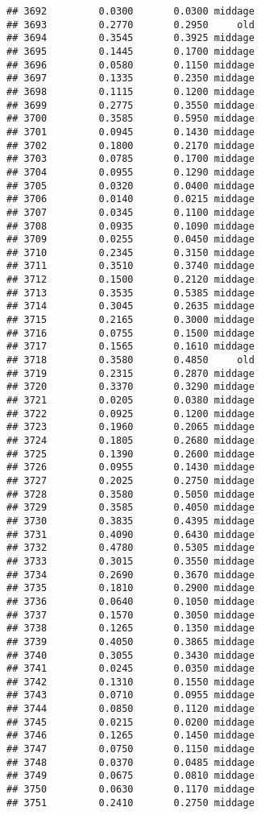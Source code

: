 \documentclass[
]{article}
\begin{document}
\begin{verbatim}
## 3692         0.0300       0.0300 middage
## 3693         0.2770       0.2950     old
## 3694         0.3545       0.3925 middage
## 3695         0.1445       0.1700 middage
## 3696         0.0580       0.1150 middage
## 3697         0.1335       0.2350 middage
## 3698         0.1115       0.1200 middage
## 3699         0.2775       0.3550 middage
## 3700         0.3585       0.5950 middage
## 3701         0.0945       0.1430 middage
## 3702         0.1800       0.2170 middage
## 3703         0.0785       0.1700 middage
## 3704         0.0955       0.1290 middage
## 3705         0.0320       0.0400 middage
## 3706         0.0140       0.0215 middage
## 3707         0.0345       0.1100 middage
## 3708         0.0935       0.1090 middage
## 3709         0.0255       0.0450 middage
## 3710         0.2345       0.3150 middage
## 3711         0.3510       0.3740 middage
## 3712         0.1500       0.2120 middage
## 3713         0.3535       0.5385 middage
## 3714         0.3045       0.2635 middage
## 3715         0.2165       0.3000 middage
## 3716         0.0755       0.1500 middage
## 3717         0.1565       0.1610 middage
## 3718         0.3580       0.4850     old
## 3719         0.2315       0.2870 middage
## 3720         0.3370       0.3290 middage
## 3721         0.0205       0.0380 middage
## 3722         0.0925       0.1200 middage
## 3723         0.1960       0.2065 middage
## 3724         0.1805       0.2680 middage
## 3725         0.1390       0.2600 middage
## 3726         0.0955       0.1430 middage
## 3727         0.2025       0.2750 middage
## 3728         0.3580       0.5050 middage
## 3729         0.3585       0.4050 middage
## 3730         0.3835       0.4395 middage
## 3731         0.4090       0.6430 middage
## 3732         0.4780       0.5305 middage
## 3733         0.3015       0.3550 middage
## 3734         0.2690       0.3670 middage
## 3735         0.1810       0.2900 middage
## 3736         0.0640       0.1050 middage
## 3737         0.1570       0.3050 middage
## 3738         0.1265       0.1350 middage
## 3739         0.4050       0.3865 middage
## 3740         0.3055       0.3430 middage
## 3741         0.0245       0.0350 middage
## 3742         0.1310       0.1550 middage
## 3743         0.0710       0.0955 middage
## 3744         0.0850       0.1120 middage
## 3745         0.0215       0.0200 middage
## 3746         0.1265       0.1450 middage
## 3747         0.0750       0.1150 middage
## 3748         0.0370       0.0485 middage
## 3749         0.0675       0.0810 middage
## 3750         0.0630       0.1170 middage
## 3751         0.2410       0.2750 middage

\end{verbatim}
\end{document}
